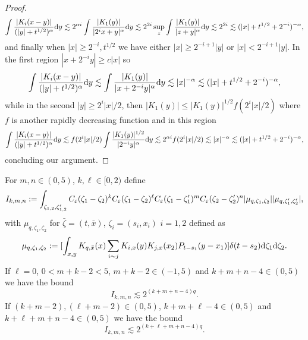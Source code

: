 \begin{appendices}
\begin{proof}
  \[ \int \frac{| K_i (x - y) |}{(| y | + t^{1 / 2})^{\alpha}} \mathrm{d} y
     \lesssim 2^{\alpha i} \int \frac{| K_1 (y) |}{| 2^i x + y |^{\alpha}}
     \mathrm{d} y \lesssim 2^{2 i} \sup_z \int \frac{| K_1 (y) |}{| z + y
     |^{\alpha}} \mathrm{d} y \lesssim 2^{2 i} \lesssim (| x | + t^{1 / 2} + 2^{-
     i})^{- \alpha}, \]
  and finally when $| x | \geqslant 2^{- i}, t^{1 / 2}$ we have either $| x |
  \geqslant 2^{- i + 1} | y |$ or $| x | < 2^{- i + 1} | y |$. In the first
  region $| x + 2^{- i} y | \geqslant c | x |$ so
  \[ \int \frac{| K_i (x - y) |}{(| y | + t^{1 / 2})^{\alpha}} \mathrm{d} y
     \lesssim \int \frac{| K_1 (y) |}{| x + 2^{- i} y |^{\alpha}} \mathrm{d} y
     \lesssim | x |^{- \alpha} \lesssim (| x | + t^{1 / 2} + 2^{- i})^{-
     \alpha}, \]
  while in the second $| y | \geqslant 2^i | x | / 2$, then $| K_1 (y) |
  \leqslant | K_1 (y) |^{1 / 2} f (2^i | x | / 2)$ where $f$ is another
  rapidly decreasing function and in this region
  \[ \int \frac{| K_i (x - y) |}{(| y | + t^{1 / 2})^{\alpha}} \mathrm{d} y
     \lesssim f (2^i | x | / 2) \int \frac{| K_1 (y) |^{1 / 2}}{| 2^{- i} y
     |^{\alpha}} \mathrm{d} y \lesssim 2^{\alpha i} f (2^i | x | / 2) \lesssim | x
     |^{- \alpha} \lesssim (| x | + t^{1 / 2} + 2^{- i})^{- \alpha}, \]
  concluding our argument.
\end{proof}

\begin{lemma}
  \label{l:integral-est-final}For $m, n \in (0, 5)$, $k, \ell \in [0, 2)$
  define
  \[ I_{k, m, n} := \int_{\zeta_{1, 2}, \zeta'_{1, 2}} C_{\varepsilon}
     (\zeta_1 - \zeta_2)^k C_{\varepsilon} (\zeta_1 - \zeta_2)^{\ell}
     C_{\varepsilon} (\zeta_1 - \zeta'_1)^m C_{\varepsilon} (\zeta_2 -
     \zeta'_2)^n | \mu_{q, \zeta_1, \zeta_2} | | \mu_{q, \zeta_1', \zeta_2'}
     |, \]
  with $\mu_{q, \zeta_1, \zeta_2}$ for $\bar{\zeta} = (t, \bar{x})$, $\zeta_i
  = (s_i, x_i)$ $i = 1, 2$ defined as
  \[ \mu_{q, \zeta_1, \zeta_2} := [\int_{x, y} K_{q, \bar{x}} (x) \sum_{i
     \sim j} K_{i, x} (y) K_{j, x} (x_2) P_{t - s_1} (y - x_1)] \delta (t -
     s_2) \mathrm{d} \zeta_1 \mathrm{d} \zeta_2 . \]
  If $\ell = 0$, $0 < m + k - 2 < 5$, $m + k - 2 \in (- 1, 5)$ and $k + m + n
  - 4 \in (0, 5)$ we have the bound
  \[ I_{k, m, n} \lesssim 2^{(k + m + n - 4) q} . \]
  If $(k + m - 2), (\ell + m - 2) \in (0, 5)$, $k + m + \ell - 4 \in (0, 5)$
  and $k + \ell + m + n - 4 \in (0, 5)$ we have the bound
  \[ I_{k, m, n} \lesssim 2^{(k + \ell + m + n - 4) q} . \]
\end{lemma}


\end{appendices}
